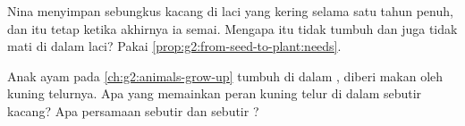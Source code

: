 \begin{exercise}[$\star\star$]\label{exo:g2:from-seed-to-plant:9}
Nina menyimpan sebungkus  kacang di laci yang kering selama satu
tahun penuh, dan  itu tetap  ketika akhirnya ia semai.
Mengapa  itu tidak tumbuh dan juga tidak mati di dalam laci? Pakai
\cref{prop:g2:from-seed-to-plant:needs}.
\end{exercise}

\begin{exercise}[$\star\star$]\label{exo:g2:from-seed-to-plant:10}
Anak ayam pada \cref{ch:g2:animals-grow-up} tumbuh di dalam ,
diberi makan oleh kuning telurnya. Apa yang memainkan peran kuning
telur di dalam sebutir kacang? Apa persamaan sebutir  dan sebutir
?
\end{exercise}
